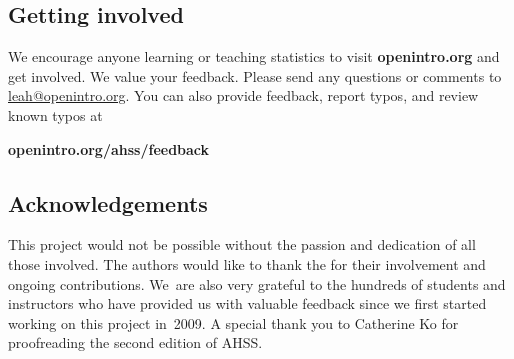 \subsection*{{\color{oiB}Getting involved}}
We encourage anyone learning or teaching statistics to visit
    {\color{black}\textbf{openintro.org}}
and get involved.
We value your feedback.
Please send any questions or comments to \href{mailto:leah@openintro.org}{leah@openintro.org}.  You can also provide feedback, report typos, and review known typos at
\begin{center}
    {\color{black}\textbf{openintro.org/ahss/feedback}}
\end{center}


\subsection*{{\color{oiB}Acknowledgements}}

This project would not be possible without the passion
and dedication of all those involved.
The authors would like to thank the
for their involvement and ongoing contributions.
We~are also very grateful to the hundreds of students
and instructors who have provided us with valuable feedback
since we first started working on this project in~2009.
A special thank you to Catherine Ko for proofreading
the second edition of AHSS.




